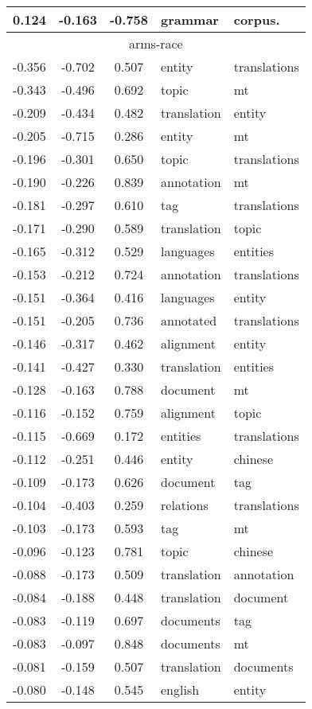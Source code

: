 \begin{tabular}{cccp{5cm}p{5cm}}
0.124 & -0.163 & -0.758 & grammar & corpus. \\
\midrule
\multicolumn{5}{c}{arms-race}\\
-0.356 & -0.702 & 0.507 & entity & translations \\
-0.343 & -0.496 & 0.692 & topic & mt \\
-0.209 & -0.434 & 0.482 & translation & entity \\
-0.205 & -0.715 & 0.286 & entity & mt \\
-0.196 & -0.301 & 0.650 & topic & translations \\
-0.190 & -0.226 & 0.839 & annotation & mt \\
-0.181 & -0.297 & 0.610 & tag & translations \\
-0.171 & -0.290 & 0.589 & translation & topic \\
-0.165 & -0.312 & 0.529 & languages & entities \\
-0.153 & -0.212 & 0.724 & annotation & translations \\
-0.151 & -0.364 & 0.416 & languages & entity \\
-0.151 & -0.205 & 0.736 & annotated & translations \\
-0.146 & -0.317 & 0.462 & alignment & entity \\
-0.141 & -0.427 & 0.330 & translation & entities \\
-0.128 & -0.163 & 0.788 & document & mt \\
-0.116 & -0.152 & 0.759 & alignment & topic \\
-0.115 & -0.669 & 0.172 & entities & translations \\
-0.112 & -0.251 & 0.446 & entity & chinese \\
-0.109 & -0.173 & 0.626 & document & tag \\
-0.104 & -0.403 & 0.259 & relations & translations \\
-0.103 & -0.173 & 0.593 & tag & mt \\
-0.096 & -0.123 & 0.781 & topic & chinese \\
-0.088 & -0.173 & 0.509 & translation & annotation \\
-0.084 & -0.188 & 0.448 & translation & document \\
-0.083 & -0.119 & 0.697 & documents & tag \\
-0.083 & -0.097 & 0.848 & documents & mt \\
-0.081 & -0.159 & 0.507 & translation & documents \\
-0.080 & -0.148 & 0.545 & english & entity \\

\end{tabular}
